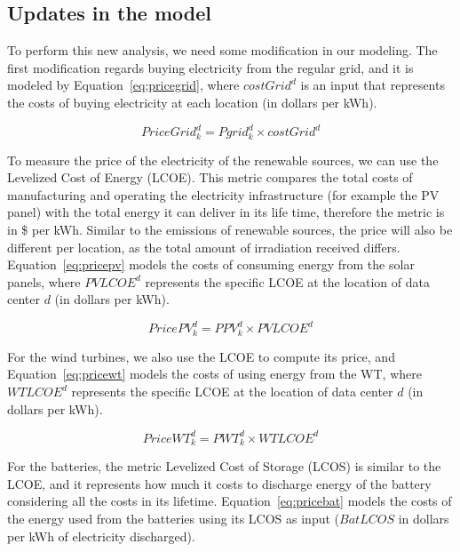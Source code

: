 \subsection{Updates in the model}

To perform this new analysis, we need some modification in our modeling. The first modification regards buying electricity from the regular grid, and it is modeled by Equation~\eqref{eq:pricegrid}, where $costGrid^d$ is an input that represents the costs of buying electricity at each location (in dollars per kWh). 

\begin{equation} \label{eq:pricegrid}
 PriceGrid^d_k = Pgrid^d_k \times costGrid^d
\end{equation}

To measure the price of the electricity of the renewable sources, we can use the Levelized Cost of Energy (LCOE). This metric compares the total costs of manufacturing and operating the electricity infrastructure (for example the PV panel) with the total energy it can deliver in its life time, therefore the metric is in \$ per kWh. Similar to the  emissions of renewable sources, the price will also be different per location, as the total amount of irradiation received differs.  Equation~\eqref{eq:pricepv} models the costs of consuming energy from the solar panels, where $PVLCOE^d$ represents the specific LCOE at the location of data center $d$ (in dollars per kWh).

\begin{equation} \label{eq:pricepv}
  PricePV^d_k = PPV^d_k \times PVLCOE^d
\end{equation}


For the wind turbines, we also use the LCOE to compute its price, and Equation~\eqref{eq:pricewt} models the costs of using energy from the WT, where $WTLCOE^d$ represents the specific LCOE at the location of data center $d$ (in dollars per kWh).


\begin{equation} \label{eq:pricewt}
  PriceWT^d_k = PWT^d_k \times WTLCOE^d
\end{equation}

For the batteries, the metric Levelized Cost of Storage (LCOS) is similar to the LCOE, and it represents how much it costs to discharge energy of the battery considering all the costs in its lifetime. Equation~\eqref{eq:pricebat} models the costs of the energy used from the batteries using its LCOS as input ($BatLCOS$ in dollars per kWh of electricity discharged).

